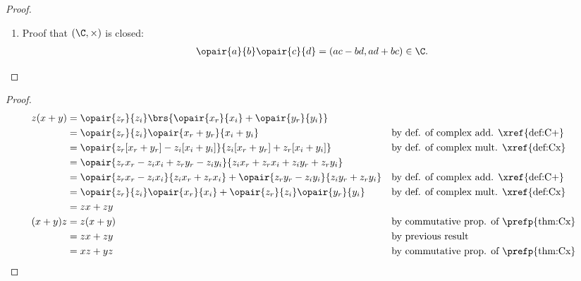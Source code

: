 \begin{proof}
\begin{enumerate}
\begin{enumerate}
      \item Proof that $(\C,\times)$ is closed:
        \begin{align*}
          \opair{a}{b}\opair{c}{d} &= (ac-bd, ad+bc)\in\C.
        \end{align*}
  \end{enumerate}
\end{enumerate}
\end{proof}



\begin{proposition}
\label{prop:C_distrib}
\end{proposition}
\begin{proof}
\begin{align*}
  z(x+y)
    &= \opair{z_r}{z_i}\brs{\opair{x_r}{x_i}+\opair{y_r}{y_i}}
  \\&= \opair{z_r}{z_i}\opair{x_r+y_r}{x_i+y_i}
    && \text{by def. of complex add. \xref{def:C+}}
  \\&= \opair{z_r[x_r+y_r] - z_i[x_i+y_i]}{z_i[x_r+y_r] + z_r[x_i+y_i]}
    && \text{by def. of complex mult. \xref{def:Cx}}
  \\&= \opair{z_rx_r - z_ix_i + z_ry_r - z_iy_i}{z_ix_r + z_rx_i + z_iy_r + z_ry_i}
  \\&= \opair{z_rx_r - z_ix_i}{z_ix_r + z_rx_i} + \opair{z_ry_r - z_iy_i}{z_iy_r + z_ry_i}
    && \text{by def. of complex add. \xref{def:C+}}
  \\&= \opair{z_r}{z_i}\opair{x_r}{x_i} + \opair{z_r}{z_i}\opair{y_r}{y_i}
    && \text{by def. of complex mult. \xref{def:Cx}}
  \\&= zx + zy
  \\
  (x+y)z
    &= z(x+y)
    && \text{by commutative prop. of \prefp{thm:Cx}}
  \\&= zx+zy
    && \text{by previous result}
  \\&= xz+yz
    && \text{by commutative prop. of \prefp{thm:Cx}}
\end{align*}
\end{proof}


